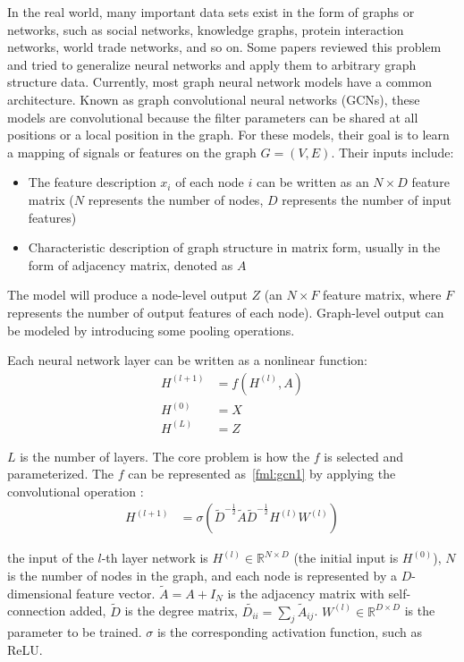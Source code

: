 In the real world, many important data sets exist in the form of graphs or networks, such as social networks, knowledge graphs, protein interaction networks, world trade networks, and so on. Some papers reviewed this problem and tried to generalize neural networks and apply them to arbitrary graph structure data\cite{wu2018socialgcn,dettmers2018convolutional}. Currently, most graph neural network models have a common architecture. Known as graph convolutional neural networks (GCNs), these models are convolutional because the filter parameters can be shared at all positions or a local position in the graph. For these models, their goal is to learn a mapping of signals or features on the graph \(G=(V,E)\). Their inputs include:

\begin{itemize}
	\item The feature description \(x_i\) of each node \(i\) can be written as an \(N\times D\) feature matrix (\(N\) represents the number of nodes, \(D\) represents the number of input features)
	\item Characteristic description of graph structure in matrix form, usually in the form of adjacency matrix, denoted as \(A\)
\end{itemize}

The model will produce a node-level output \(Z\) (an \(N\times F\) feature matrix, where \(F\) represents the number of output features of each node). Graph-level output can be modeled by introducing some pooling operations.

Each neural network layer can be written as a nonlinear function:
\begin{align}
	H^{(l+1)} & =f(H^{(l)}, A) \\
	H^{(0)}   & =X             \\
	H^{(L)}   & =Z
\end{align}

\(L\) is the number of layers. The core problem is how the \(f\) is selected and parameterized. The \(f\) can be represented as~\ref{fml:gcn1} by applying the convolutional operation \cite{kipf2016semi}:
\begin{align}
	H^{(l+1)} & =\sigma(\tilde{D}^{-\frac{1}{2}} \tilde{A} \tilde{D}^{-\frac{1}{2}} H^{(l)} W^{(l)})\label{fml:gcn1}
\end{align}

the input of the \(l\)-th layer network is \(H^{(l)}\in \mathbb{R}^{N\times D}\) (the initial input is \(H^{(0)}\)), \(N\) is the number of nodes in the graph, and each node is represented by a \(D\)-dimensional feature vector. \(\tilde{A}=A+I_N\) is the adjacency matrix with self-connection added, \(\tilde{D}\) is the degree matrix, \(\tilde{D_{ii}}=\sum_{j}{\tilde{A}_{ij}}\). \(W^{(l)}\in \mathbb{R}^{D\times D}\) is the parameter to be trained. \(\sigma \) is the corresponding activation function, such as ReLU\@.

